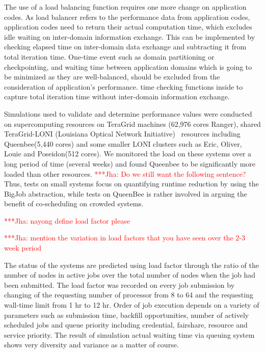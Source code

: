 \documentclass[conference,final]{IEEEtran}
\newcommand{\jhanote}[1]{ {\textcolor{red} { ***Jha: #1 }}}
\newcommand{\jhanote}[1]{}
\begin{document}

The use of a load balancing function requires one more change on application codes. As load balancer refers to the performance data from application codes, application codes need to return their
actual computation time, which excludes idle waiting on inter-domain information exchange. This can be implemented by checking elapsed time on inter-domain data exchange and subtracting it from total iteration time.
One-time event such as domain partitioning or checkpointing, and
waiting time between application domains which is going to be
minimized as they are well-balanced, should be excluded from the
consideration of application's performance.
time checking functions inside to capture total iteration time without
inter-domain information exchange.


Simulations used to validate and determine performance values were
conducted on supercomputing resources on TeraGrid machines (62,976
cores Ranger), shared TeraGrid-LONI (Louisiana Optical Network
Initiative)~\cite{LONI_web} resources including  Queenbee(5,440 cores) and some smaller LONI clusters such as Eric, Oliver, Louie and Poseidon(512 cores).
We monitored the load on these
systems over a long period of time (several weeks) and found Queenbee
to be significantly more loaded than other resources.  \jhanote{Do we
  still want the following sentence?} Thus, tests on small systems
focus on quantifying runtime reduction by using the BigJob
abstraction, while tests on QueenBee is rather involved in arguing the
benefit of co-scheduling on crowded systems.


\jhanote{nayong define load factor please}

\jhanote{mention the variation in load factors that you have seen over
  the 2-3 week period}
  

The status of the systems are predicted using load factor through the ratio of the number of nodes in active jobs over the total number of nodes when the job had been submitted. The load factor was recorded on every job submission by changing of the requesting number of processor from 8 to 64 and the requesting wall-time limit from 1 hr to 12 hr. Order of job execution depends on a variety of parameters such as submission time, backfill opportunities, number of actively scheduled jobs and queue priority including credential, fairshare, resource and service priority. The result of simulation actual waiting time via queuing system shows very diversity and variance as a matter of course. 
\end{document}
